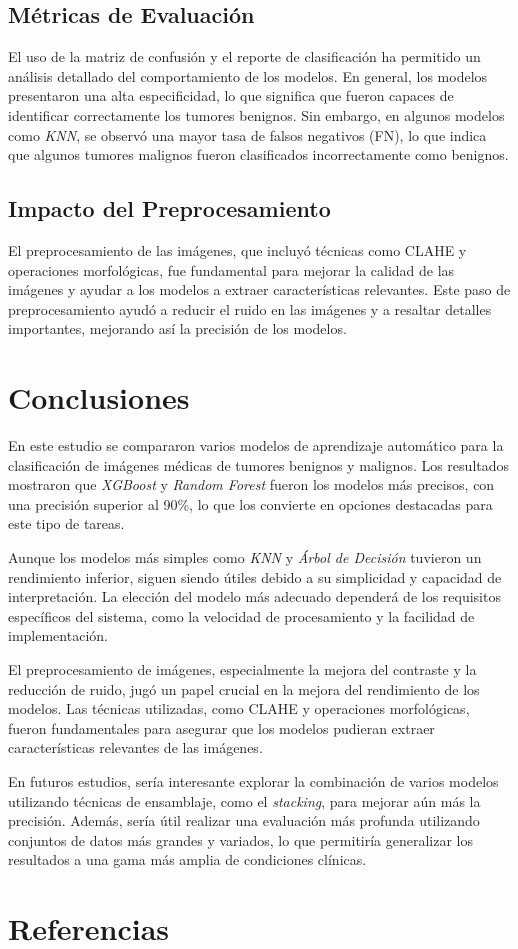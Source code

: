 \documentclass[12pt]{article}
\begin{document}
\subsection{Métricas de Evaluación}
El uso de la matriz de confusión y el reporte de clasificación ha permitido un análisis detallado del comportamiento de los modelos. En general, los modelos presentaron una alta especificidad, lo que significa que fueron capaces de identificar correctamente los tumores benignos. Sin embargo, en algunos modelos como \textit{KNN}, se observó una mayor tasa de falsos negativos (FN), lo que indica que algunos tumores malignos fueron clasificados incorrectamente como benignos.

\subsection{Impacto del Preprocesamiento}
El preprocesamiento de las imágenes, que incluyó técnicas como CLAHE y operaciones morfológicas\cite{soille1999morphological}, fue fundamental para mejorar la calidad de las imágenes y ayudar a los modelos a extraer características relevantes. Este paso de preprocesamiento ayudó a reducir el ruido en las imágenes y a resaltar detalles importantes, mejorando así la precisión de los modelos.


\section{Conclusiones}
En este estudio se compararon varios modelos de aprendizaje automático para la clasificación de imágenes médicas de tumores benignos y malignos. Los resultados mostraron que \textit{XGBoost} y \textit{Random Forest} fueron los modelos más precisos, con una precisión superior al 90\%, lo que los convierte en opciones destacadas para este tipo de tareas.

Aunque los modelos más simples como \textit{KNN} y \textit{Árbol de Decisión} tuvieron un rendimiento inferior, siguen siendo útiles debido a su simplicidad y capacidad de interpretación. La elección del modelo más adecuado dependerá de los requisitos específicos del sistema, como la velocidad de procesamiento y la facilidad de implementación.

El preprocesamiento de imágenes, especialmente la mejora del contraste y la reducción de ruido, jugó un papel crucial en la mejora del rendimiento de los modelos. Las técnicas utilizadas, como CLAHE y operaciones morfológicas\cite{soille1999morphological}, fueron fundamentales para asegurar que los modelos pudieran extraer características relevantes de las imágenes.

En futuros estudios, sería interesante explorar la combinación de varios modelos utilizando técnicas de ensamblaje, como el \textit{stacking}, para mejorar aún más la precisión. Además, sería útil realizar una evaluación más profunda utilizando conjuntos de datos más grandes y variados, lo que permitiría generalizar los resultados a una gama más amplia de condiciones clínicas.

\section{Referencias}


\end{document}
